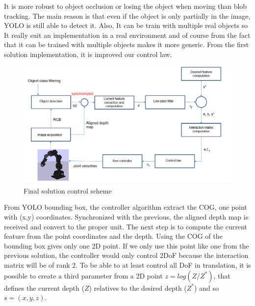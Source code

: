 It is more robust to object occlusion or losing the object when moving than blob tracking. The main reason is that even if the object is only partially in the image, YOLO is still able to detect it. Also, It can be train with multiple real objects so It really suit an implementation in a real environment and of course from the fact that it can be trained with multiple objects makes it more generic. From the first solution implementation, it is improved our control law. 

\begin{figure} [!h]
    \centering
    \includegraphics[width=1\linewidth]{images/final_control_scheme.png}
    \caption{Final solution control scheme}
    \label{pict:control_scheme_final}
\end{figure}

From YOLO bounding box, the controller algorithm extract the \gls{COG}, one point with (x,y) coordinates. Synchronized with the previous, the aligned depth map is received and convert to the proper unit. The next step is to compute the current feature from the point coordinates and the depth.
Using the COG of the bounding box gives only one 2D point. If we only use this point like one from the previous solution, the controller would only control 2DoF because the interaction matrix will be of rank 2. To be able to at least control all DoF in translation, it is possible to create a third parameter from a 2D point $z = log( Z/Z^*)$, that defines the current depth ($Z$) relatives to the desired depth ($Z^*$) and so $s = (x, y, z)$. \\

